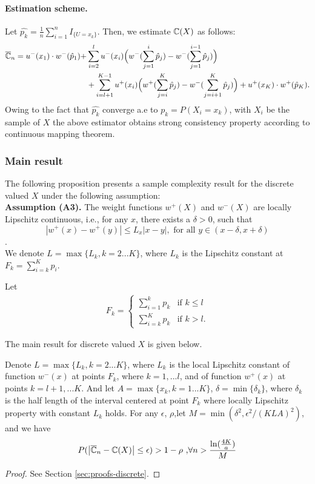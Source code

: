 \paragraph{Estimation scheme.} 
Let $\hat{p_k}= \frac{1}{n} \sum_{i=1}^n I_{\{U =x_k\}}$. Then, we estimate $\mathbb{C}(X)$ as follows:
\begin{align}
 \label{eq:cpt-discrete-est}
\overline {\mathbb{C}}_n = 
u^-(x_1)\cdot w^-(\hat p_1)+
& \sum_{i=2}^l u^-(x_i) \Big(w^-(\sum_{j=1}^i \hat p_j) - w^-(\sum_{j=1}^{i-1} \hat p_j)\Big) 
\\
&
+ \sum_{i=l+1}^{K-1} u^+(x_i) \Big(w^+(\sum_{j=i}^K \hat p_j) - w^-(\sum_{j=i+1}^K \hat p_j) \Big)+ u^+(x_K)\cdot w^+(\hat p_K).
\end{align}
Owing to the fact that $\hat{p_k}$ converge a.e to $p_k=P(X_i=x_k)$, with $X_i$ be the sample of $X$ the above estimator obtains strong consistency property according to continuous mapping theorem. 


\subsubsection*{Main result}
The following proposition presents a sample complexity result for the discrete valued $X$ under the following assumption:\\
\textbf{Assumption (A3).}  The weight functions $w^+(X)$ and $w^-(X)$ are locally Lipschitz continuous, i.e., for any $x$, there exists a $\delta>0$, such that
$$| w^+(x) - w^+(y) | \leq L_x |x-y|, \text{ for all } y \in (x-\delta,x+\delta) $$.\\

We denote $L=\max\{L_k, k=2...K\}$,  where $L_k$ is the Lipschitz constant at $F_k = \sum_{i=k}^K p_i$.


Let 
\begin{align}
\label{eq:Fk}
F_k = 
\begin{cases}
   \sum_{i=1}^k p_k & \text{if   } k \leq l \\
   \sum_{i=k}^K p_k & \text{if  }  k > l.
\end{cases}  
\end{align}

The main result for discrete valued $X$ is given below.
\begin{proposition}
\label{prop:sample-complexity-discrete}
Denote $L=\max\{L_k, k=2...K\} $, where $L_k$ is the local Lipschitz constant of function $w^-(x)$ at points
$F_k$, where $k=1,...l$, and of function $w^+(x)$ at points $k=l+1,...K$. 
And let $A=\max\{x_k, k=1...K\}$, $\delta =\min\{\delta_k\}$, where $\delta_k$ is the half length of the interval centered at point $F_k$ where locally Lipschitz property with constant $L_k$ holds.
For any $\epsilon$, $\rho$,let $M=\min(\delta^2, \epsilon^2/(KLA)^2)$, and we have 
\begin{align}
P(\left|
\overline {\mathbb{C}}_n -\mathbb{C}(X)
\right| \leq \epsilon) > 1-\rho \text{        ,} \forall n> \frac{\ln(\frac{4K}{a})} { M} 
\end{align}
\end{proposition}
\begin{proof}
 See Section \ref{sec:proofs-discrete}.
\end{proof}

